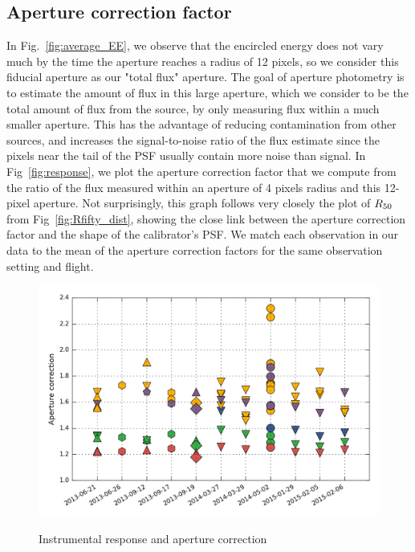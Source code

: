 \subsection{Aperture correction factor}
\label{subsec:apcorr}
In Fig.~\ref{fig:average_EE}, we observe that the encircled energy does not vary much by the time the aperture reaches a radius of 12 pixels, so we consider this fiducial aperture as our "total flux" aperture. The goal of aperture photometry is to estimate the amount of flux in this large aperture, which we consider to be the total amount of flux from the source, by only measuring flux within a much smaller aperture. This has the advantage of reducing contamination from other sources, and increases the signal-to-noise ratio of the flux estimate since the pixels near the tail of the PSF usually contain more noise than signal. 
In Fig~\ref{fig:response}, we plot the aperture correction factor that we compute from the ratio of the flux measured within an aperture of 4 pixels radius and this 12-pixel aperture.  Not surprisingly, this graph follows very closely the plot of $R_{50}$ from Fig~\ref{fig:Rfifty_dist}, showing the close link between the aperture correction factor and the shape of the calibrator's PSF. We match each observation in our data to the mean of the aperture correction factors for the same observation setting and flight.

\begin{figure}[!h]
\begin{center}
\includegraphics[width=\textwidth]{Figures/Aper_corr.png}
\label{fig:aper_corr}
\vspace{-0.5cm}
\caption[aperture correction]{Instrumental response and aperture correction}
\end{center}
\end{figure}



